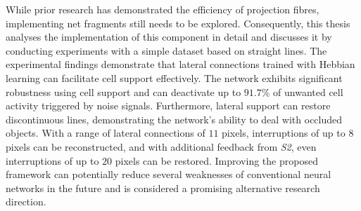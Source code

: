 While prior research has demonstrated the efficiency of projection fibres, implementing net fragments still needs to be explored.
Consequently, this thesis analyses the implementation of this component in detail and discusses it by conducting experiments with a simple dataset based on straight lines.
The experimental findings demonstrate that lateral connections trained with Hebbian learning can facilitate cell support effectively.
The network exhibits significant robustness using cell support and can deactivate up to $91.7\%$ of unwanted cell activity triggered by noise signals. Furthermore, lateral support can restore discontinuous lines, demonstrating the network's ability to deal with occluded objects. With a range of lateral connections of $11$ pixels, interruptions of up to $8$ pixels can be reconstructed, and with additional feedback from \emph{S2}, even interruptions of up to $20$ pixels can be restored. Improving the proposed framework can potentially reduce several weaknesses of conventional neural networks in the future and is considered a promising alternative research direction.

